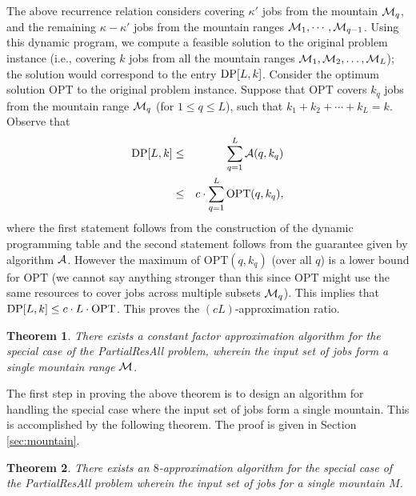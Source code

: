 \documentclass[11pt]{article}
\newtheorem{theorem}{Theorem}
\newcommand{\opt}{{\mathrm{OPT}}}
\newcommand{\PResAll}{{\sc PartialResAll}}
\newcommand{\calM} {{\cal M}}
\newcommand{\cA} {{\cal A}}
\newcommand{\calA} {\cA}
\newcommand{\DP} {{\rm DP}}
\begin{document}
The above recurrence relation considers covering $\kappa'$ jobs from the mountain $\calM_q$, 
and the remaining $\kappa - \kappa'$  jobs from the mountain ranges $\calM_1, \cdots, \calM_{q-1}$.
Using this dynamic program, we compute a feasible solution to the original problem instance 
(i.e., covering $k$ jobs from all the mountain ranges $\calM_1,\calM_2, \ldots, \calM_L$);
the solution would correspond to the entry $\DP[L,k]$.
Consider the optimum solution $\opt$ to the original problem instance. 
Suppose that $\opt$ covers $k_q$ jobs from the mountain range $\calM_q$ (for $1\leq q \leq L$), 
such that $k_1 + k_2 +\cdots + k_L = k$. 
Observe that 
\begin{eqnarray*}
\DP[L,k] 
&\leq& \sum_{q=1}^L \calA(q, k_q)\\
&\leq& c\cdot{\sum_{q=1}^L \opt(q, k_q)},
\end{eqnarray*}
where the first statement follows from the construction of the dynamic programming table
and the second statement follows from the guarantee given by algorithm $\calA$.
However the maximum of $\opt(q, k_q)$ (over all $q$) is a lower bound for $\opt$
(we cannot say anything stronger than this since $\opt$ might 
use the same resources to cover jobs across multiple subsets $\calM_q$). 
This implies that $\DP[L,k] \leq c\cdot L \cdot\opt$. This proves
the $(cL)$-approximation ratio. 

\begin{theorem}
\label{thm:xCCC}
There exists a constant factor approximation algorithm for the special case of the {\PResAll} problem,
wherein the input set of jobs form a single mountain range $\calM$.
\end{theorem}

The first step in proving the above theorem is to design an algorithm for handling the special case where the input set of jobs
form a single mountain. This is accomplished by the following theorem. The proof is given in 
Section \ref{sec:mountain}.

\begin{theorem}
\label{thm:xDDD}
There exists an $8$-approximation algorithm for the special case of the {\PResAll} problem
wherein the input set of jobs for a single mountain $M$.
\end{theorem}
\end{document}
